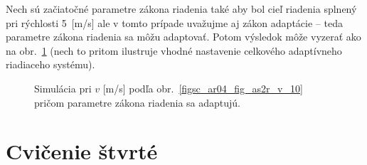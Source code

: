 \documentclass[a4paper, 10pt, ]{article}
\begin{document}
Nech sú začiatočné parametre zákona riadenia také aby bol cieľ riadenia splnený pri rýchlosti 5~[m/s] ale v tomto prípade uvažujme aj zákon adaptácie -- teda parametre zákona riadenia sa môžu adaptovať. Potom výsledok môže vyzerať ako na obr.~\ref{figsc_ar04_fig_as2r_yu_89} (nech to pritom ilustruje vhodné nastavenie celkového adaptívneho riadiaceho systému).



\begin{figure}[t]
	\centering



	\caption{Simulácia pri $v$ [m/s] podľa obr.~\ref{figsc_ar04_fig_as2r_v_10} pričom parametre zákona riadenia sa adaptujú.}
	\label{figsc_ar04_fig_as2r_yu_89}

\end{figure}























\section{Cvičenie štvrté}
\label{cvictretie}
\end{document}

